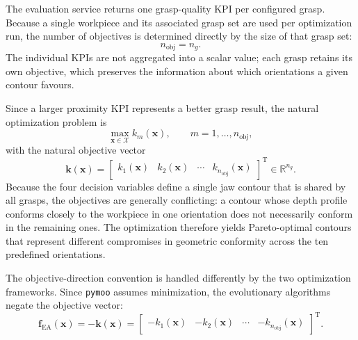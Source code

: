 The evaluation service returns one grasp-quality KPI per configured grasp. Because a single
workpiece and its associated grasp set are used per optimization run, the number of objectives is
determined directly by the size of that grasp set:
\begin{equation}
    n_{\text{obj}} = n_g .
\end{equation}
The individual KPIs are not aggregated into a scalar
value; each grasp retains its own objective, which preserves the information about which
orientations a given contour favours.

Since a larger proximity KPI represents a better grasp result, the natural optimization problem is
\begin{equation}
    \max_{\mathbf{x}\in\mathcal{X}} k_m(\mathbf{x}),
    \qquad
    m=1,\ldots,n_{\text{obj}},
\end{equation}
with the natural objective vector
\begin{equation}
    \mathbf{k}(\mathbf{x})
    =
    \begin{bmatrix}
        k_1(\mathbf{x}) &
        k_2(\mathbf{x}) &
        \cdots &
        k_{n_{\text{obj}}}(\mathbf{x})
    \end{bmatrix}^{\mathrm{T}}
    \in \mathbb{R}^{n_g}.
\end{equation}
Because the four decision variables define a single jaw contour that is shared by all grasps, the
objectives are generally conflicting: a contour whose depth profile conforms closely to the
workpiece in one orientation does not necessarily conform in the remaining ones. The optimization
therefore yields Pareto-optimal contours that represent different compromises in geometric
conformity across the ten predefined orientations.


The objective-direction convention is handled differently by the two optimization frameworks. Since
\texttt{pymoo} assumes minimization, the evolutionary algorithms negate the objective vector:
\begin{equation}
    \mathbf{f}_{\mathrm{EA}}(\mathbf{x})
    =
    -\mathbf{k}(\mathbf{x})
    =
    \begin{bmatrix}
        -k_1(\mathbf{x}) &
        -k_2(\mathbf{x}) &
        \cdots &
        -k_{n_{\text{obj}}}(\mathbf{x})
    \end{bmatrix}^{\mathrm{T}}.
\end{equation}

